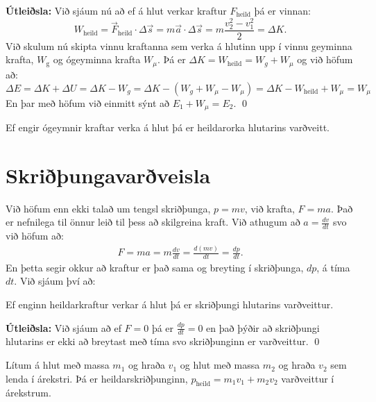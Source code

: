 \ifdefined \wholebook \else\documentclass[oneside]{book}\usepackage{EdlBook}\graphicspath{{figures/}}
\begin{document}
\textbf{Útleiðsla:} Við sjáum nú að ef á hlut verkar kraftur $F_{\text{heild}}$ þá er vinnan:
\begin{equation*}
    W_{\text{heild}} = \vec{F}_{\text{heild}} \cdot \Delta \vec{s} = m \vec{a} \cdot \Delta \vec{s} = m \frac{v_2^2 - v_1^2}{2} = \Delta K.
\end{equation*}
Við skulum nú skipta vinnu kraftanna sem verka á hlutinn upp í vinnu geyminna krafta, $W_\text{g}$ og ógeyminna krafta $W_\mu$. Þá er $\Delta K = W_{\text{heild}} = W_g + W_\mu$ og við höfum að:
\begin{equation*}
    \Delta E = \Delta K + \Delta U = \Delta K - W_g = \Delta K - (W_g + W_\mu - W_\mu) =  \Delta K - W_{\text{heild}} + W_\mu = W_\mu
\end{equation*}
En þar með höfum við einmitt sýnt að $E_1 + W_\mu = E_2$. \qed

\begin{tcolorbox}
\begin{theorem}
Ef engir ógeymnir kraftar verka á hlut þá er heildarorka hlutarins varðveitt.
\end{theorem}
\end{tcolorbox}

\newpage

\section{Skriðþungavarðveisla}

Við höfum enn ekki talað um tengsl skriðþunga, $p = mv$, við krafta, $F = ma$. Það er nefnilega til önnur leið til þess að skilgreina kraft. Við athugum að $a = \frac{dv}{dt}$ svo við höfum að:
\begin{align*}
    F = ma = m\frac{dv}{dt} = \frac{d(mv)}{dt} = \frac{dp}{dt}.
\end{align*}
En þetta segir okkur að kraftur er það sama og breyting í skriðþunga, $dp$, á tíma $dt$. Við sjáum því að:

\begin{tcolorbox}
\begin{theorem}
Ef enginn heildarkraftur verkar á hlut þá er skriðþungi hlutarins varðveittur.
\end{theorem}
\end{tcolorbox}

\textbf{Útleiðsla:} Við sjáum að ef $F = 0$ þá er $\frac{dp}{dt} = 0$ en það þýðir að skriðþungi hlutarins er ekki að breytast með tíma svo skriðþunginn er varðveittur. \qed

\begin{tcolorbox}
\begin{theorem}
Lítum á hlut með massa $m_1$ og hraða $v_1$ og hlut með massa $m_2$ og hraða $v_2$ sem lenda í árekstri. Þá er heildarskriðþunginn, $p_{\text{heild}} = m_1 v_1 + m_2 v_2$ varðveittur í árekstrum.
\end{theorem}
\end{tcolorbox}
\end{document}

